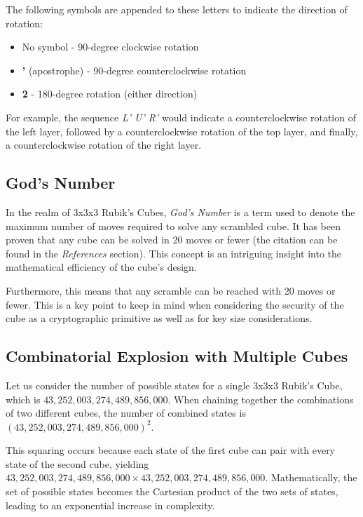 \documentclass[12pt]{article}
\begin{document}
The following symbols are appended to these letters to indicate the direction of rotation:

\begin{itemize}
    \item No symbol - 90-degree clockwise rotation
    \item \textbf{'} (apostrophe) - 90-degree counterclockwise rotation
    \item \textbf{2} - 180-degree rotation (either direction)
\end{itemize}

For example, the sequence \textit{L' U' R'} would indicate a counterclockwise rotation of the left layer, followed by a counterclockwise rotation of the top layer, and finally, a counterclockwise rotation of the right layer.

\subsection{God's Number}
In the realm of 3x3x3 Rubik's Cubes, \textit{God's Number} is a term used to denote the maximum number of moves required to solve any scrambled cube. It has been proven that any cube can be solved in 20 moves or fewer (the citation can be found in the \textit{References} section). This concept is an intriguing insight into the mathematical efficiency of the cube's design.

Furthermore, this means that any scramble can be reached with 20 moves or fewer. This is a key point to keep in mind when considering the security of the cube as a cryptographic primitive as well as for key size considerations.\\

\subsection{Combinatorial Explosion with Multiple Cubes}
Let us consider the number of possible states for a single 3x3x3 Rubik's Cube, which is \(43,252,003,274,489,856,000\). When chaining together the combinations of two different cubes, the number of combined states is \((43,252,003,274,489,856,000)^2\).

This squaring occurs because each state of the first cube can pair with every state of the second cube, yielding \(43,252,003,274,489,856,000 \times 43,252,003,274,489,856,000\). Mathematically, the set of possible states becomes the Cartesian product of the two sets of states, leading to an exponential increase in complexity.
\end{document}
